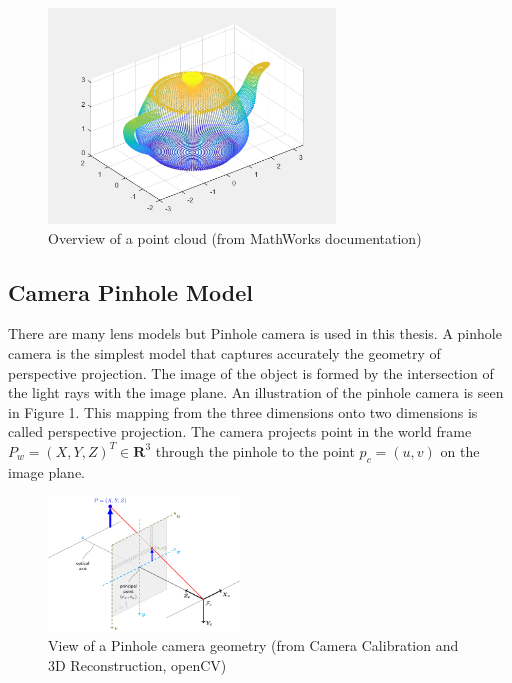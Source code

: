 \begin{figure}[!h]
\begin{center}
\includegraphics[width=3in]{figures02/pcd.png}
\caption{Overview of a point cloud (from MathWorks documentation)}%
\end{center}
\label{fig2:mypicture3}
\end{figure}


\subsection{ Camera Pinhole Model}\label{pinhole}
There are many lens models but Pinhole camera is used in this thesis. A pinhole camera is the simplest model that captures accurately the geometry of perspective projection. The image of the object is formed by the intersection of the light rays with the image plane. An illustration of the pinhole camera is seen in  Figure 1. This mapping from the three dimensions onto two dimensions is called perspective projection. The camera projects point in the world frame $ P_{w}=(X,Y,Z)^{T} \in \textbf{R}^{3}$ through the pinhole to  the point $p_{c}=(u,v)$ on the image plane.
 
\begin{figure}[!h]
\begin{center}
\includegraphics[width=2in]{figures02/pinhole_camera_model.png}
\caption{View of a Pinhole camera geometry (from Camera Calibration and 3D Reconstruction, openCV)}%
\end{center}
\end{figure}

